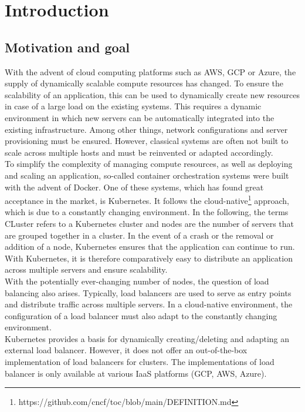 \chapter{Introduction}


\section{Motivation and goal}
With the advent of cloud computing platforms such as AWS, GCP or Azure, the supply of dynamically scalable compute resources has changed.
To ensure the scalability of an application, this can be used to dynamically create new resources in case of a large load on the existing systems.
This requires a dynamic environment in which new servers can be automatically integrated into the existing infrastructure.
Among other things, network configurations and server provisioning must be ensured.
However, classical systems are often not built to scale across multiple hosts and must be reinvented or adapted accordingly.
\\
To simplify the complexity of managing compute resources, as well as deploying and scaling an application, so-called container orchestration systems were built with the advent of Docker.
One of these systems, which has found great acceptance in the market, is Kubernetes.
It follows the cloud-native\footnote{https://github.com/cncf/toc/blob/main/DEFINITION.md} approach, which is due to a constantly changing environment.
In the following, the terms CLuster refers to a Kubernetes cluster and nodes are the number of servers that are grouped together in a cluster.
In the event of a crash or the removal or addition of a node, Kubernetes ensures that the application can continue to run.
With Kubernetes, it is therefore comparatively easy to distribute an application across multiple servers and ensure scalability.
\\
With the potentially ever-changing number of nodes, the question of load balancing also arises.
Typically, load balancers are used to serve as entry points and distribute traffic across multiple servers.
In a cloud-native environment, the configuration of a load balancer must also adapt to the constantly changing environment.
\\
Kubernetes provides a basis for dynamically creating/deleting and adapting an external load balancer.
However, it does not offer an out-of-the-box implementation of load balancers for clusters.
The implementations of load balancer is only available at various IaaS platforms (GCP, AWS, Azure).
